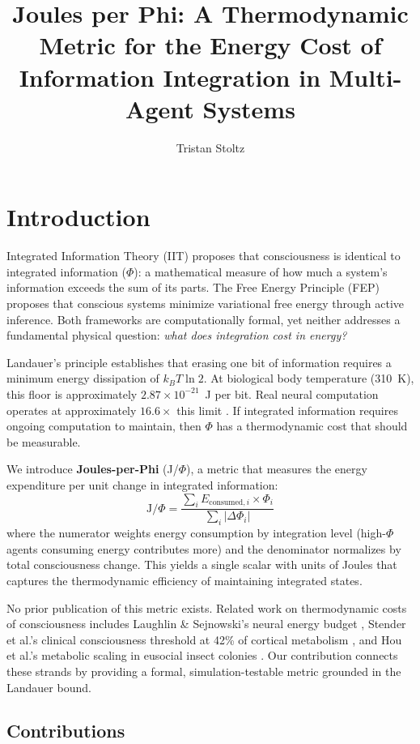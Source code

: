 \documentclass[entropy,article]{Definitions/mdpi}
\title{Joules per Phi: A Thermodynamic Metric for the Energy Cost of Information Integration in Multi-Agent Systems}
\author{Tristan Stoltz}
\begin{document}
\section{Introduction}
\label{sec:intro}

Integrated Information Theory (IIT) \citep{tononi2004,oizumi2014} proposes that consciousness is identical to integrated information ($\Phi$): a mathematical measure of how much a system's information exceeds the sum of its parts. The Free Energy Principle (FEP) \citep{friston2010} proposes that conscious systems minimize variational free energy through active inference. Both frameworks are computationally formal, yet neither addresses a fundamental physical question: \emph{what does integration cost in energy?}

Landauer's principle \citep{landauer1961} establishes that erasing one bit of information requires a minimum energy dissipation of $k_BT\ln 2$. At biological body temperature (310~K), this floor is approximately $2.87 \times 10^{-21}$~J per bit. Real neural computation operates at approximately $16.6\times$ this limit \citep{laughlin2003}. If integrated information requires ongoing computation to maintain, then $\Phi$ has a thermodynamic cost that should be measurable.

We introduce \textbf{Joules-per-Phi} (J/$\Phi$), a metric that measures the energy expenditure per unit change in integrated information:
\begin{equation}
\text{J}/\Phi = \frac{\sum_i E_{\text{consumed},i} \times \Phi_i}{\sum_i |\Delta\Phi_i|}
\label{eq:jphi}
\end{equation}
where the numerator weights energy consumption by integration level (high-$\Phi$ agents consuming energy contributes more) and the denominator normalizes by total consciousness change. This yields a single scalar with units of Joules that captures the thermodynamic efficiency of maintaining integrated states.

No prior publication of this metric exists. Related work on thermodynamic costs of consciousness includes Laughlin \& Sejnowski's neural energy budget \citep{laughlin2003}, Stender et al.'s clinical consciousness threshold at 42\% of cortical metabolism \citep{stender2015}, and Hou et al.'s metabolic scaling in eusocial insect colonies \citep{hou2010}. Our contribution connects these strands by providing a formal, simulation-testable metric grounded in the Landauer bound.

\subsection{Contributions}
\end{document}
